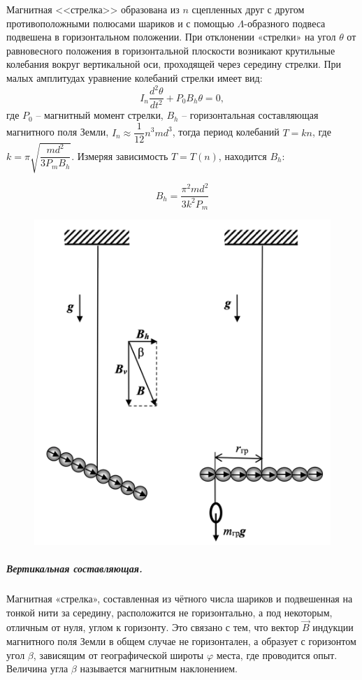 \documentclass[12pt,a4paper]{article}
\begin{document}
Магнитная <<стрелка>> образована из $n$ сцепленных друг с другом противоположными полюсами шариков и с помощью $\Lambda$-образного подвеса подвешена в горизонтальном положении. 
При отклонении «стрелки» на угол $\theta$ от равновесного положения в горизонтальной плоскости возникают крутильные колебания вокруг вертикальной оси, проходящей через середину стрелки. 
При малых амплитудах уравнение колебаний стрелки имеет вид:
\[
I_n \dfrac{d^2 \theta}{dt^2} + P_0 B_h \theta = 0,
\] 
где $P_0$ -- магнитный момент стрелки, $B_h$ -- горизонтальная составляющая магнитного поля Земли, $I_n \approx \dfrac{1}{12}n^3 m d^3$, тогда период колебаний $T = kn$, где $k = \pi \sqrt{\dfrac{md^2}{3P_m B_h}}$. 
Измеряя зависимость $T=T(n)$, находится $B_h$:

\begin{equation}
    B_h = \dfrac{\pi^2 m d^2}{3k^2P_m}
\end{equation}

\begin{figure}
    \includegraphics[width=\linewidth]{pics/pic2.png}
\end{figure} 

\subparagraph*{Вертикальная составляющая.} 
Магнитная «стрелка», составленная из чётного числа шариков и подвешенная на тонкой нити за середину, расположится не горизонтально, а под некоторым, отличным от нуля, углом к горизонту. 
Это связано с тем, что вектор $\vec{B}$ индукции магнитного поля Земли в общем случае не горизонтален, а образует с горизонтом угол $\beta$, зависящим от географической широты $\varphi$ места, где проводится опыт. 
Величина угла $\beta$ называется магнитным наклонением.
\end{document}
